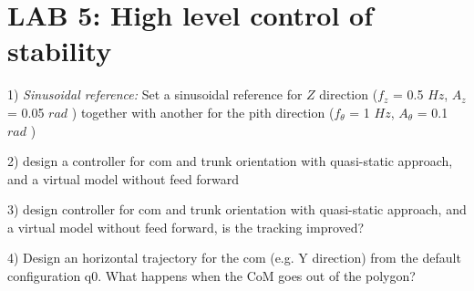 \documentclass{report}
\begin{document}
\section*{LAB 5: High level control of stability}

1) \textit{Sinusoidal reference:} 
Set a sinusoidal reference for $Z$ direction ($f_z$ = 0.5 $Hz$, $A_z$ = 0.05 $rad$ )
together with another for the pith direction ($f_{\theta}$ = 1 $Hz$, $A_{\theta}$ = 0.1 $rad$ )

2) design a controller for com and trunk orientation with quasi-static approach, and a virtual model without feed forward

3) design controller for com and trunk orientation with quasi-static approach, and a virtual model without feed forward, is the tracking improved?

4) Design an horizontal trajectory for the com (e.g. Y direction) from the default configuration q0.
What happens when the CoM goes out of the polygon?
\end{document}

